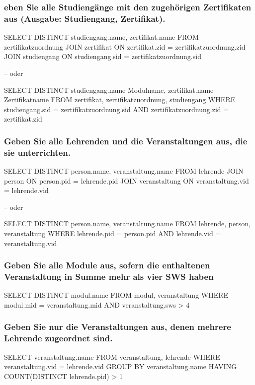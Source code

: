     \subsubsection{eben Sie alle Studiengänge mit den zugehörigen Zertifikaten aus (Ausgabe: Studiengang, Zertifikat).}
    \begin{sql}
        SELECT DISTINCT studiengang.name, zertifikat.name
            FROM zertifikatzuordnung
            JOIN zertifikat ON zertifikat.zid = zertifikatzuordnung.zid
            JOIN studiengang ON studiengang.sid = zertifikatzuordnung.sid

            -- oder

        SELECT DISTINCT studiengang.name Modulname, zertifikat.name Zertifikatname
            FROM zertifikat, zertifikatzuordnung, studiengang
            WHERE studiengang.sid = zertifikatzuordnung.sid
            AND zertifikatzuordnung.zid = zertifikat.zid
    \end{sql}

    \subsubsection{Geben Sie alle Lehrenden und die Veranstaltungen aus, die sie unterrichten.}
    \begin{sql}
        SELECT DISTINCT person.name, veranstaltung.name
            FROM lehrende
            JOIN person ON person.pid = lehrende.pid
            JOIN veranstaltung ON veranstaltung.vid = lehrende.vid

            -- oder

        SELECT DISTINCT person.name, veranstaltung.name
            FROM lehrende, person, veranstaltung
            WHERE lehrende.pid = person.pid AND lehrende.vid = veranstaltung.vid
    \end{sql}

    \subsubsection{Geben Sie alle Module aus, sofern die enthaltenen Veranstaltung in Summe mehr als vier SWS haben}
    \begin{sql}
        SELECT DISTINCT modul.name
            FROM modul, veranstaltung
            WHERE modul.mid = veranstaltung.mid
            AND veranstaltung.sws > 4
    \end{sql}

    \subsubsection{Geben Sie nur die Veranstaltungen aus, denen mehrere Lehrende zugeordnet sind.}
    \begin{sql}
        SELECT veranstaltung.name
            FROM veranstaltung, lehrende
            WHERE veranstaltung.vid = lehrende.vid
            GROUP BY veranstaltung.name
            HAVING COUNT(DISTINCT lehrende.pid) > 1
    \end{sql}

